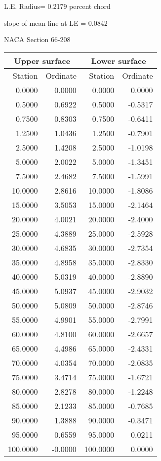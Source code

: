 \documentclass[11pt]{book}
\begin{document}
L.E. Radius=  0.2179 percent chord


 slope of mean line at LE =  0.0842
 \newpage
  \label{s66-208}
 \begin{Large}
 NACA Section 66-208
 \end{Large}
  
 \vspace{8mm}
 \begin{tabular}{|r|r|r|r|} \hline 
 \multicolumn{2}{|c|}{Upper surface} & \multicolumn{2}{|c|}{Lower surface} \\
 \hline
 Station & Ordinate & Station & Ordinate \\
 \hline
0.0000 & 0.0000 & 0.0000 & 0.0000 \\
0.5000 & 0.6922 & 0.5000 & -0.5317 \\
0.7500 & 0.8303 & 0.7500 & -0.6411 \\
1.2500 & 1.0436 & 1.2500 & -0.7901 \\
2.5000 & 1.4208 & 2.5000 & -1.0198 \\
5.0000 & 2.0022 & 5.0000 & -1.3451 \\
7.5000 & 2.4682 & 7.5000 & -1.5991 \\
10.0000 & 2.8616 & 10.0000 & -1.8086 \\
15.0000 & 3.5053 & 15.0000 & -2.1464 \\
20.0000 & 4.0021 & 20.0000 & -2.4000 \\
25.0000 & 4.3889 & 25.0000 & -2.5928 \\
30.0000 & 4.6835 & 30.0000 & -2.7354 \\
35.0000 & 4.8958 & 35.0000 & -2.8330 \\
40.0000 & 5.0319 & 40.0000 & -2.8890 \\
45.0000 & 5.0937 & 45.0000 & -2.9032 \\
50.0000 & 5.0809 & 50.0000 & -2.8746 \\
55.0000 & 4.9901 & 55.0000 & -2.7991 \\
60.0000 & 4.8100 & 60.0000 & -2.6657 \\
65.0000 & 4.4986 & 65.0000 & -2.4331 \\
70.0000 & 4.0354 & 70.0000 & -2.0835 \\
75.0000 & 3.4714 & 75.0000 & -1.6721 \\
80.0000 & 2.8278 & 80.0000 & -1.2248 \\
85.0000 & 2.1233 & 85.0000 & -0.7685 \\
90.0000 & 1.3888 & 90.0000 & -0.3471 \\
95.0000 & 0.6559 & 95.0000 & -0.0211 \\
100.0000 & -0.0000 & 100.0000 & 0.0000 \\
 \hline 
 \end{tabular}
\end{document}
